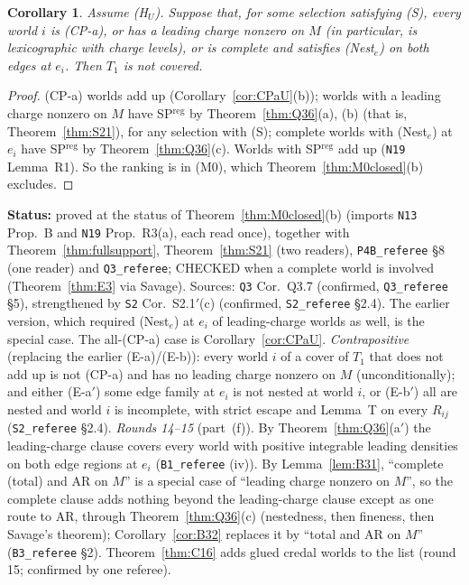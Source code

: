 \documentclass[11pt]{article}
\newtheorem{corollary}[theorem]{Corollary}
\theoremstyle{definition}
\theoremstyle{remark}
\newcommand{\src}[1]{\texttt{#1}}
\newcommand{\status}[1]{\par\smallskip\noindent\textbf{Status:} #1\par\smallskip}
\begin{document}
\begin{corollary}\label{cor:Q37}
Assume (H$_U$). Suppose that, for some selection satisfying (S), every world $i$ is (CP-a), or has a leading charge nonzero on $M$ (in particular, is lexicographic with charge levels), or is complete and satisfies (Nest$_e$) on both edges at $e_i$. Then $T_1$ is not covered.
\end{corollary}
\begin{proof}
(CP-a) worlds add up (Corollary~\ref{cor:CPaU}(b)); worlds with a leading charge nonzero on $M$ have SP$^{\mathrm{reg}}$ by Theorem~\ref{thm:Q36}(a), (b) (that is, Theorem~\ref{thm:S21}), for any selection with (S); complete worlds with (Nest$_e$) at $e_i$ have SP$^{\mathrm{reg}}$ by Theorem~\ref{thm:Q36}(c). Worlds with SP$^{\mathrm{reg}}$ add up (\src{N19} Lemma~R1). So the ranking is in (M0), which Theorem~\ref{thm:M0closed}(b) excludes.
\end{proof}
\status{proved at the status of Theorem~\ref{thm:M0closed}(b) (imports \src{N13} Prop.~B and \src{N19} Prop.~R3(a), each read once), together with Theorem~\ref{thm:fullsupport}, Theorem~\ref{thm:S21} (two readers), \src{P4B\_referee} \S8 (one reader) and \src{Q3\_referee}; CHECKED when a complete world is involved (Theorem~\ref{thm:E3} via Savage). Sources: \src{Q3} Cor.~Q3.7 (confirmed, \src{Q3\_referee} \S5), strengthened by \src{S2} Cor.~S2.1$'$(c) (confirmed, \src{S2\_referee} \S2.4). The earlier version, which required (Nest$_e$) at $e_i$ of leading-charge worlds as well, is the special case. The all-(CP-a) case is Corollary~\ref{cor:CPaU}. \emph{Contrapositive} (replacing the earlier (E-a)/(E-b)): every world $i$ of a cover of $T_1$ that does not add up is not (CP-a) and has no leading charge nonzero on $M$ (unconditionally); and either (E-a$'$) some edge family at $e_i$ is not nested at world $i$, or (E-b$'$) all are nested and world $i$ is incomplete, with strict escape and Lemma~T on every $R_{ij}$ (\src{S2\_referee} \S2.4). \emph{Rounds 14--15} (part~(f)). By Theorem~\ref{thm:Q36}(a$'$) the leading-charge clause covers every world with positive integrable leading densities on both edge regions at $e_i$ (\src{B1\_referee} (iv)). By Lemma~\ref{lem:B31}, ``complete (total) and AR on $M$'' is a special case of ``leading charge nonzero on $M$'', so the complete clause adds nothing beyond the leading-charge clause except as one route to AR, through Theorem~\ref{thm:Q36}(c) (nestedness, then fineness, then Savage's theorem); Corollary~\ref{cor:B32} replaces it by ``total and AR on $M$'' (\src{B3\_referee} \S2). Theorem~\ref{thm:C16} adds glued credal worlds to the list (round 15; confirmed by one referee).}
\end{document}
